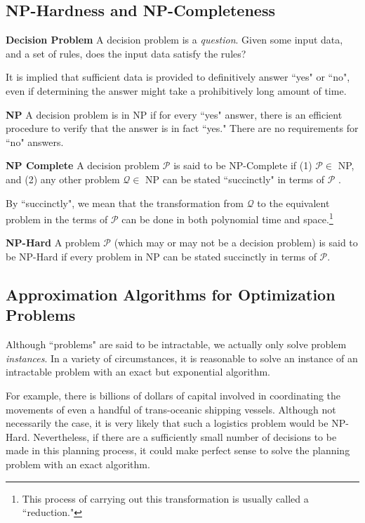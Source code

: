 \subsection*{NP-Hardness and NP-Completeness}
\begin{definition}
\textbf{Decision Problem  } A decision problem is a \textit{question}.
 Given some input data, and a set of rules, does the input data satisfy the rules?
\end{definition}
It is implied that sufficient data is provided to definitively answer ``yes" or ``no", even if determining the answer might take a prohibitively long amount of time.
\begin{definition}
\textbf{NP  } A decision problem is in NP if for every ``yes" answer, there is an efficient procedure to verify that the answer is in fact ``yes." 
There are no requirements for ``no" answers.
\end{definition}
\begin{definition}
\textbf{NP Complete  } A decision problem $\mathcal{P}$ is said to be NP-Complete if (1)
$\mathcal{P} \in $ NP, and (2) any other problem $\mathcal{Q} \in$ NP can be stated ``succinctly" in terms of $\mathcal{P}$ .
\end{definition}
By ``succinctly", we mean that the transformation from $\mathcal{Q}$ to the equivalent problem in the terms of $\mathcal{P}$ can be done in both polynomial time and space.\footnote{This process of carrying out this transformation is usually called a ``reduction."}
\begin{definition}
\textbf{NP-Hard  } A problem $\mathcal{P}$ (which may or may not be a decision problem) is said to be NP-Hard if every problem in NP can be stated succinctly in terms of $\mathcal{P}$.
\end{definition}

\subsection*{Approximation Algorithms for Optimization Problems}\label{subsec:intractProbCope}

Although ``problems" are said to be intractable, we actually only solve problem \textit{instances}. 
In a variety of circumstances, it is reasonable to solve an instance of an intractable problem with an exact but exponential algorithm.

For example, there is billions of dollars of capital involved in coordinating the movements of even a handful of trans-oceanic shipping vessels. 
Although not necessarily the case, it is very likely that such a logistics problem would be NP-Hard.
Nevertheless, if there are a sufficiently small number of decisions to be made in this planning process, it could make perfect sense to solve the planning problem with an exact algorithm.

